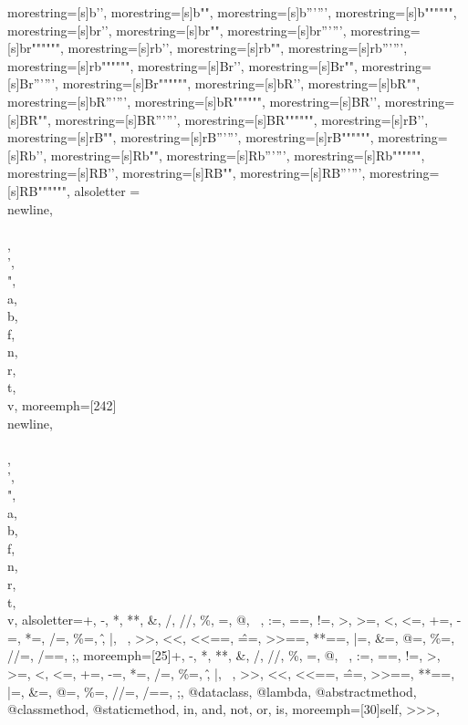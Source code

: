 {  morestring=[s]{b'}{'}, morestring=[s]{b"}{"},
  morestring=[s]{b'''}{'''}, morestring=[s]{b"""}{"""},
  morestring=[s]{br'}{'}, morestring=[s]{br"}{"},
  morestring=[s]{br'''}{'''}, morestring=[s]{br"""}{"""},
  morestring=[s]{rb'}{'}, morestring=[s]{rb"}{"},
  morestring=[s]{rb'''}{'''}, morestring=[s]{rb"""}{"""},
  morestring=[s]{Br'}{'}, morestring=[s]{Br"}{"},
  morestring=[s]{Br'''}{'''}, morestring=[s]{Br"""}{"""},
  morestring=[s]{bR'}{'}, morestring=[s]{bR"}{"},
  morestring=[s]{bR'''}{'''}, morestring=[s]{bR"""}{"""},
  morestring=[s]{BR'}{'}, morestring=[s]{BR"}{"},
  morestring=[s]{BR'''}{'''}, morestring=[s]{BR"""}{"""},
  morestring=[s]{rB'}{'}, morestring=[s]{rB"}{"},
  morestring=[s]{rB'''}{'''}, morestring=[s]{rB"""}{"""},
  morestring=[s]{Rb'}{'}, morestring=[s]{Rb"}{"},
  morestring=[s]{Rb'''}{'''}, morestring=[s]{Rb"""}{"""},
  morestring=[s]{RB'}{'}, morestring=[s]{RB"}{"},
  morestring=[s]{RB'''}{'''}, morestring=[s]{RB"""}{"""},
  alsoletter = {\\newline,\\\\,\\',\\",\\a,\\b,\\f,\\n,\\r,\\t,\\v},
  moreemph=[242]{\\newline,\\\\,\\',\\",\\a,\\b,\\f,\\n,\\r,\\t,\\v},
  alsoletter={+, -, *, **, \&, /, //, \%, =, @, ~, :=, ==, !=, >, >=, <, <=,
  +=, -=, *=, /=, \%=, \^, |, ~, >>, <<, <<==, \^==, >>==, **==, |=, \&=, @=,
  \%=, //=, /==, ;},
  moreemph=[25]{+, -, *, **, \&, /, //, \%, =, @, ~, :=, ==, !=, >, >=, <, <=,
  +=, -=, *=, /=, \%=, \^, |, ~, >>, <<, <<==, \^==, >>==, **==, |=, \&=, @=,
  \%=, //=, /==, ;, @dataclass, @lambda, @abstractmethod, @classmethod,
  @staticmethod, in, and, not, or, is},
  moreemph=[30]{self, >>>},
}
